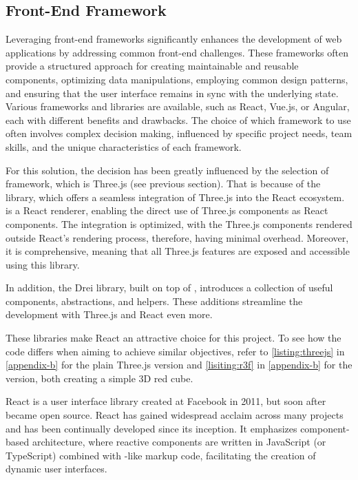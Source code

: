 \subsection{Front-End Framework}

Leveraging front-end frameworks significantly enhances the development of web applications by addressing common front-end challenges. These frameworks often provide a structured approach for creating maintainable and reusable components, optimizing data manipulations, employing common design patterns, and ensuring that the user interface remains in sync with the underlying state. Various frameworks and libraries are available, such as React, Vue.js, or Angular, each with different benefits and drawbacks. The choice of which framework to use often involves complex decision making, influenced by specific project needs, team skills, and the unique characteristics of each framework.~\cite{Gimeno2018, Pekarsky2020}

For this solution, the decision has been greatly influenced by the selection of  framework, which is Three.js (see previous section). That is because of the  library, which offers a seamless integration of Three.js into the React ecosystem.  is a React renderer, enabling the direct use of Three.js components as React components. The integration is optimized, with the Three.js components rendered outside React's rendering process, therefore, having minimal overhead. Moreover, it is comprehensive, meaning that all Three.js features are exposed and accessible using this library.~\cite{R3F}

In addition, the Drei library, built on top of , introduces a collection of useful components, abstractions, and helpers. These additions streamline the development with Three.js and React even more.~\cite{Drei}

These libraries make React an attractive choice for this project. To see how the code differs when aiming to achieve similar objectives, refer to \autoref{listing:threejs} in \autoref{appendix-b} for the plain Three.js version and \autoref{lisiting:r3f} in \autoref{appendix-b} for the  version, both creating a simple 3D red cube.

React is a user interface library created at Facebook in 2011, but soon after became open source. React has gained widespread acclaim across many projects and has been continually developed since its inception. It emphasizes component-based architecture, where reactive components are written in JavaScript (or TypeScript) combined with -like markup code, facilitating the creation of dynamic user interfaces.~\cite{Banks2020}

